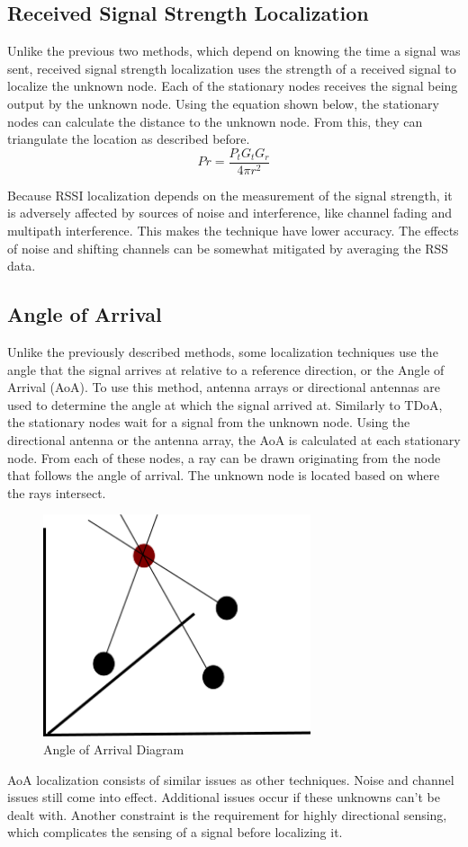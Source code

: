 \subsection{Received Signal Strength Localization}
Unlike the previous two methods, which depend on knowing the time a signal was sent, received signal strength localization uses the strength of a received signal to localize the unknown node\cite{local_conf}. Each of the stationary nodes receives the signal being output by the unknown node. Using the equation shown below\cite{rss_calc}, the stationary nodes can calculate the distance to the unknown node. From this, they can triangulate the location as described before.
\[Pr = \frac{P_t G_t G_r}{4πr^2} \]\par
Because RSSI localization depends on the measurement of the signal strength, it is adversely affected by sources of noise and interference, like channel fading and multipath interference\cite{local_conf}. This makes the technique have lower accuracy. The effects of noise and shifting channels can be somewhat mitigated by averaging the RSS data.

\subsection{Angle of Arrival}
Unlike the previously described methods, some localization techniques use the angle that the signal arrives at relative to a reference direction, or the Angle of Arrival (AoA)\cite{local_aoa}. To use this method, antenna arrays or directional antennas are used to determine the angle at which the signal arrived at. Similarly to TDoA, the stationary nodes wait for a signal from the unknown node. Using the directional antenna or the antenna array, the AoA is calculated at each stationary node. From each of these nodes, a ray can be drawn originating from the node that follows the angle of arrival. The unknown node is located based on where the rays intersect.
\begin{figure}[ht]
\centering
\includegraphics[width=0.70\textwidth]{img/path4188.png}
\caption{Angle of Arrival Diagram}
\label{fig:aoa_diagram}
\end{figure}\par
AoA localization consists of similar issues as other techniques. Noise and channel issues still come into effect. Additional issues occur if these unknowns can’t be dealt with. Another constraint is the requirement for highly directional sensing, which complicates the sensing of a signal before localizing it.

